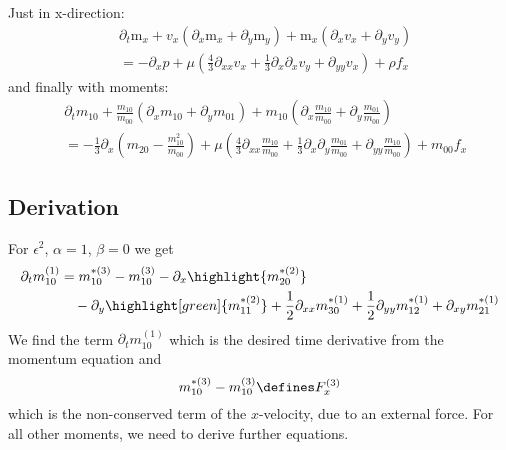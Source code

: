 Just in x-direction:
\begin{equation}
  \begin{aligned}
    & \partial_t \text{m}_x
    + v_x (\partial_x \text{m}_x + \partial_y \text{m}_y)
    + \text{m}_x (\partial_x v_x + \partial_y v_y)  \\
    & =
     - \partial_x p
     + \mu \left(\frac{4}{3}\partial_{xx}v_x
            + \frac{1}{3}\partial_x\partial_x v_y
            + \partial_{yy} v_x \right)  + \rho f_x
  \end{aligned}
\end{equation}
and finally with moments:
\begin{equation}
  \begin{aligned}
    & \partial_t m_{10}
    + \frac{m_{10}}{m_{00}} (\partial_x m_{10} + \partial_y m_{01})
    + m_{10} (\partial_x \frac{m_{10}}{m_{00}} + \partial_y \frac{m_{01}}{m_{00}})  \\
    & =
    - \frac{1}{3} \partial_x \left(m_{20} - \frac{ m_{10}^2 }{ m_{00} } \right)
     + \mu \left(\frac{4}{3}\partial_{xx}\frac{m_{10}}{m_{00}}
            + \frac{1}{3}\partial_x\partial_y \frac{m_{01}}{m_{00}}
            + \partial_{yy} \frac{m_{10}}{m_{00}} \right) + m_{00}f_x
  \end{aligned}
\end{equation}

\subsection{Derivation}
\label{sub:Derivation of momentum equation}

For $\epsilon^2$, $\alpha=1$, $\beta=0$ we get
\begin{equation}
  \label{eq: start of momentum equation derivation}
  \begin{aligned}
     \partial_t m_{10}^{(1)} & =
    m_{10}^{*(3)} - m_{10}^{(3)} - \partial_x \highlight{m_{20}^{*(2)}} \\
    &\quad - \partial_y \highlight[green]{m_{11}^{*(2)}} + \frac{1}{2}\partial_{xx} m_{30}^{*(1)} + \frac{1}{2} \partial_{yy} m_{12}^{*(1)} + \partial_{xy} m_{21}^{*(1)}
  \end{aligned}
\end{equation}
We find the term $\partial_t m_{10}^{(1)} $ which is the desired time derivative from the momentum equation and
\begin{equation}
  m_{10}^{*(3)} - m_{10}^{(3)}\defines F_x^{(3)}
\end{equation}
 which is the non-conserved term of the $x$-velocity, due to an external force. For all other moments, we need to derive further equations.

